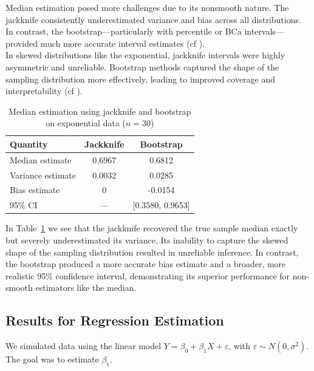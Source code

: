 \documentclass[aodsor,preprint]{imsart}
\numberwithin{equation}{section}
\theoremstyle{plain}
\begin{document}
Median estimation posed more challenges due to its nonsmooth nature. The jackknife consistently underestimated variance and bias across all distributions. In contrast, the bootstrap—particularly with percentile or BCa intervals—provided much more accurate interval estimates (cf \cite{shao1995jackknife,efron1993introduction}). \\

In skewed distributions like the exponential, jackknife intervals were highly asymmetric and unreliable. Bootstrap methods captured the shape of the sampling distribution more effectively, leading to improved coverage and interpretability (cf \cite{davison1997bootstrap,efron1993introduction}).\\

\begin{table}[h!]
\centering
\caption{Median estimation using jackknife and bootstrap on exponential data ($n=30$)}
\begin{tabular}{lcc}
\hline
\textbf{Quantity} & \textbf{Jackknife} & \textbf{Bootstrap} \\
\hline
Median estimate     & 0.6967 & 0.6812 \\
Variance estimate   & 0.0032 & 0.0285 \\
Bias estimate       & 0      & -0.0154 \\
95\% CI             & ---    & [0.3580, 0.9653] \\
\hline
\end{tabular}
\label{tab:median-exp}
\end{table}

In Table~\ref{tab:median-exp} we see that the jackknife recovered the true sample median exactly but severely underestimated its variance. Its inability to capture the skewed shape of the sampling distribution resulted in unreliable inference. In contrast, the bootstrap produced a more accurate bias estimate and a broader, more realistic 95\% confidence interval, demonstrating its superior performance for non-smooth estimators like the median.


\subsection{Results for Regression Estimation}

We simulated data using the linear model \( Y = \beta_0 + \beta_1 X + \varepsilon \), with \( \varepsilon \sim N(0, \sigma^2) \). The goal was to estimate \( \beta_1 \). \\
\end{document}

